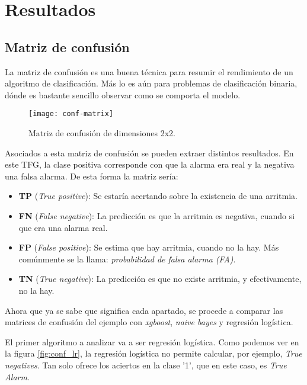 \section{Resultados}

\subsection{Matriz de confusión}
La matriz de confusión es una buena técnica para resumir el rendimiento de un algoritmo de clasificación. \cite{confusion} Más lo es aún para problemas de clasificación binaria, dónde es bastante sencillo observar como se comporta el modelo.\par 

\begin{figure}[h]
	\centering
	\texttt{[image: conf-matrix]}
	\caption{Matriz de confusión de dimensiones 2x2.}
	\label{fig:conf}
\end{figure}

Asociados a esta matriz de confusión se pueden extraer distintos resultados. En este TFG, la clase positiva corresponde con que la alarma era real y la negativa una falsa alarma. De esta forma la matriz sería:
\begin{itemize}
	\item \textbf{TP} (\textit{True positive}): Se estaría acertando sobre la existencia de una arritmia.
	\item \textbf{FN} (\textit{False negative}): La predicción es que la arritmia es negativa, cuando si que era una alarma real.
	\item \textbf{FP} (\textit{False positive}): Se estima que hay arritmia, cuando no la hay. Más comúnmente se la llama: \textit{probabilidad de falsa alarma (FA)}.
	\item \textbf{TN} (\textit{True negative}): La predicción es que no existe arritmia, y efectivamente, no la hay.
\end{itemize}

Ahora que ya se sabe que significa cada apartado, se procede a comparar las matrices de confusión del ejemplo con \textit{xgboost}, \textit{naive bayes} y regresión logística.\par 

El primer algoritmo a analizar va a ser regresión logística. Como podemos ver en la figura \ref{fig:conf_lr}, la regresión logística no permite calcular, por ejemplo, \textit{True negatives}. Tan solo ofrece los aciertos en la clase '1', que en este caso, es \textit{True Alarm}.

